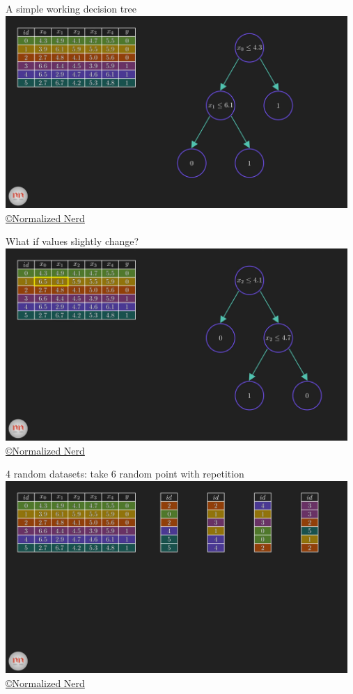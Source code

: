 \documentclass[handout, 10pt]{beamer}
\begin{document}
\begin{frame}{A simple working decision tree}
\hspace*{-1cm}\includegraphics[width=13cm]{figs/rf/_1-6 screenshot.png}
{\tiny \href{https://www.youtube.com/watch?v=ZVR2Way4nwQ}{ \copyright Normalized Nerd}}
\end{frame}

\begin{frame}{What if values slightly change?}
\hspace*{-1cm}\includegraphics[width=13cm]{figs/rf/_2-6 screenshot.png}
{\tiny \href{https://www.youtube.com/watch?v=ZVR2Way4nwQ}{ \copyright Normalized Nerd}}
\end{frame}

\begin{frame}{4 random datasets: take 6 random point with repetition}
\hspace*{-1cm}\includegraphics[width=13cm]{figs/rf/_3-33 screenshot.png}
{\tiny \href{https://www.youtube.com/watch?v=ZVR2Way4nwQ}{ \copyright Normalized Nerd}}
\end{frame}
\end{document}
